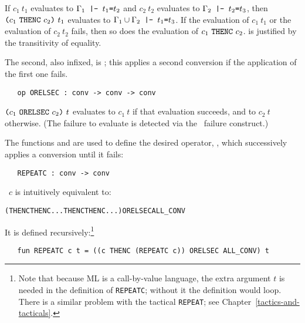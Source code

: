 \noindent If $c_1\ t_1$ evaluates to $\Gamma_1\ml{ |- }t_1\ml{=}t_2$ and
$c_2\ t_2$ evaluates to $\Gamma_2\ml{ |- }t_2\ml{=}t_3$, then
$\ml{(}c_1\ \ml{THENC}\ c_2\ml{)}\ t_1$ evaluates to $\Gamma_1\cup
\Gamma_2\ml{\ |-\ }t_1\ml{=}t_3$. If the evaluation of $c_1\ t_1$ or
the evaluation of $c_2\ t_2$ fails, then so does the evaluation of
$c_1\ \ml{THENC}\ c_2$.  is justified by the transitivity of
equality.

The second, also infixed, is ; this applies a second
conversion if the application of the first one fails.

\begin{holboxed}
\begin{verbatim}
   op ORELSEC : conv -> conv -> conv
\end{verbatim}
\end{holboxed}

\noindent $\ml{(}c_1\ \ml{ORELSEC}\ c_2\ml{)}\ t$ evaluates to $c_1\ t$
if that evaluation succeeds, and to $c_2\ t$ otherwise. (The failure
to evaluate is detected via the \ML\ failure construct.)

The functions  and  are used to define the
desired operator, , which
successively
applies a conversion until it fails:

\begin{holboxed}
\begin{verbatim}
   REPEATC : conv -> conv
\end{verbatim}
\end{holboxed}

\noindent {}\ $c$ is intuitively equivalent to:

\begin{hol}
\begin{alltt}
   ( THENC  THENC ... THENC  THENC ...) ORELSEC ALL_CONV
\end{alltt}
\end{hol}

\noindent It is defined recursively:\footnote{Note that because ML is a
  call-by-value language, the extra argument $t$ is needed in the
  definition of {\tt REPEATC}; without it the definition would loop.
  There is a similar problem with the tactical {\tt REPEAT}; see
  Chapter~\ref{tactics-and-tacticals}.}

\begin{hol}
\begin{verbatim}
   fun REPEATC c t = ((c THENC (REPEATC c)) ORELSEC ALL_CONV) t
\end{verbatim}
\end{hol}

